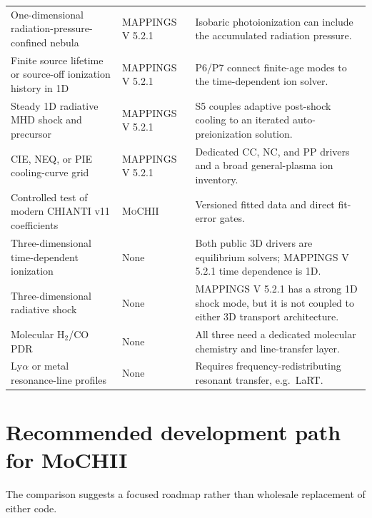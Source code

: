 \documentclass[english,a4paper]{my_memo}
\newcommand{\MoCHII}{\textsc{MoCHII}}
\newcommand{\Mappings}{MAPPINGS V 5.2.1}
\begin{document}
\begin{longtable}{P{0.42\textwidth}P{0.20\textwidth}P{0.30\textwidth}}
One-dimensional radiation-pressure-confined nebula & \Mappings{} &
Isobaric photoionization can include the accumulated radiation pressure. \\

Finite source lifetime or source-off ionization history in 1D & \Mappings{}
& P6/P7 connect finite-age modes to the time-dependent ion solver. \\

Steady 1D radiative MHD shock and precursor & \Mappings{} & S5 couples
adaptive post-shock cooling to an iterated auto-preionization solution. \\

CIE, NEQ, or PIE cooling-curve grid & \Mappings{} & Dedicated CC, NC, and
PP drivers and a broad general-plasma ion inventory. \\

Controlled test of modern CHIANTI v11 coefficients & \MoCHII{} &
Versioned fitted data and direct fit-error gates. \\

Three-dimensional time-dependent ionization & None & Both public 3D
drivers are equilibrium solvers; \Mappings{} time dependence is 1D. \\

Three-dimensional radiative shock & None & \Mappings{} has a strong 1D
shock mode, but it is not coupled to either 3D transport architecture. \\

Molecular H$_2$/CO PDR & None & All three need a dedicated molecular
chemistry and line-transfer layer. \\

Ly$\alpha$ or metal resonance-line profiles & None & Requires
frequency-redistributing resonant transfer, e.g.\ LaRT. \\
\end{longtable}

\section{Recommended development path for MoCHII}

The comparison suggests a focused roadmap rather than wholesale
replacement of either code.
\end{document}

